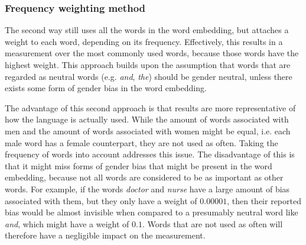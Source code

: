 \subsubsection{Frequency weighting method}
\label{method:2}
The second way still uses all the words in the word embedding, but attaches a weight to
each word, depending on its frequency. Effectively, this results in a measurement over
the most commonly used words, because those words have the highest weight.
This approach builds upon the assumption that words that are regarded as neutral words
(e.g. \textit{and}, \textit{the}) should be gender neutral, unless there exists some form
of gender bias in the word embedding.

The advantage of this second approach is that results are more representative of how
the language is actually used. While the amount of words associated with men and the
amount of words associated with women might be equal, i.e. each male word has a female
counterpart, they are not used as often.
Taking the frequency of words into account addresses this issue. 
The disadvantage of this is that
it might miss forms of gender bias that might be present in the word embedding, because
not all words are considered to be as important as other words. For example, if the words
\textit{doctor} and \textit{nurse} have a large amount of bias associated with them,
but they only have a weight of $0.00001$, then their reported bias would be almost
invisible when compared to a presumably neutral word like \textit{and}, which might have
a weight of $0.1$. Words that are not used as often will therefore have a negligible impact
on the measurement.

